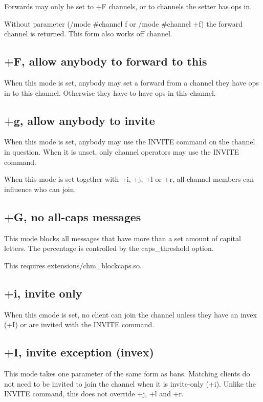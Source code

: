 	Forwards may only be set to +F channels, or to channels the setter has
	ops in.

	Without parameter (/mode \#channel f or /mode \#channel +f) the forward
	channel is returned. This form also works off channel.


\subsection{+F, allow anybody to forward to this}

	When this mode is set, anybody may set a forward from a channel they
	have ops in to this channel. Otherwise they have to have ops in this
	channel.


\subsection{+g, allow anybody to invite}

	When this mode is set, anybody may use the INVITE command on the
	channel in question. When it is unset, only channel operators may use
	the INVITE command.

	When this mode is set together with +i, +j, +l or +r, all channel
	members can influence who can join.


\subsection{+G, no all-{}caps messages}

	This mode blocks all messages that have more than a set amount of
	capital letters. The percentage is controlled by the caps\_threshold
	option.

	This requires extensions/chm\_blockcaps.so.


\subsection{+i, invite only}

	When this cmode is set, no client can join the channel unless they have
	an invex (+I) or are invited with the INVITE command.


\subsection{+I, invite exception (invex)}

	This mode takes one parameter of the same form as bans. Matching
	clients do not need to be invited to join the channel when it is
	invite-{}only (+i). Unlike the INVITE command, this does not override
	+j, +l and +r.

